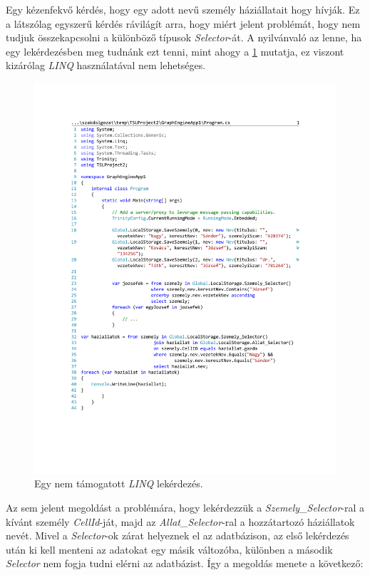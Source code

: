 Egy kézenfekvő kérdés, hogy egy adott nevű személy háziállatait hogy hívják. Ez a látszólag egyszerű kérdés rávilágít arra, hogy miért jelent problémát, hogy nem tudjuk összekapcsolni a különböző típusok \emph{Selector}-át. A nyilvánvaló az lenne, ha egy lekérdezésben meg tudnánk ezt tenni, mint ahogy a \ref{fig:Haziallatok} mutatja, ez viszont kizárólag \emph{LINQ} használatával nem lehetséges.

\begin{figure}[H]
	\centering
	\includegraphics[]{figures/HaziallatokLINQ.pdf}
	\caption{Egy nem támogatott \emph{LINQ} lekérdezés.}
	\label{fig:Haziallatok}
\end{figure}

Az sem jelent megoldást a problémára, hogy lekérdezzük a \emph{Szemely\_Selector}-ral a kívánt személy \emph{CellId}-ját, majd az \emph{Allat\_Selector}-ral a hozzátartozó háziállatok nevét. Mivel a \emph{Selector}-ok zárat helyeznek el az adatbázison, az első lekérdezés után ki kell menteni az adatokat egy másik változóba, különben a második \emph{Selector} nem fogja tudni elérni az adatbázist. Így a megoldás menete a következő:

